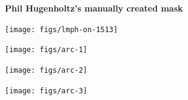 \documentclass[landscape]{slides}
\begin{document}
\begin{slide}
\begin{center}

\textbf{Phil Hugenholtz's manually created mask}
\end{center}
\small

\begin{center}
\texttt{[image: figs/lmph-on-1513]}

\end{center}
\vfill
\end{slide}
\begin{slide}\begin{center}\texttt{[image: figs/arc-1]}\end{center}\vfill\end{slide}
\begin{slide}\begin{center}\texttt{[image: figs/arc-2]}\end{center}\vfill\end{slide}
\begin{slide}\begin{center}\texttt{[image: figs/arc-3]}\end{center}\vfill\end{slide}
\end{document}

